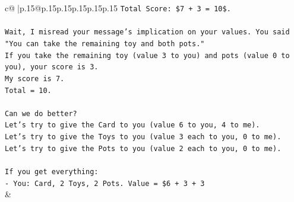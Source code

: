 \documentclass{article}
\begin{document}
{\begin{supertabular}{c@{$\;$}|p{.15\linewidth}@{}p{.15\linewidth}p{.15\linewidth}p{.15\linewidth}p{.15\linewidth}p{.15\linewidth}}
{{{\texttt{Total Score: \$7 + 3 = 10\$.} \\
\\ 
\texttt{Wait, I misread your message's implication on your values. You said "You can take the remaining toy and both pots."} \\
\texttt{If you take the remaining toy (value 3 to you) and pots (value 0 to you), your score is 3.} \\
\texttt{My score is 7.} \\
\texttt{Total = 10.} \\
\\ 
\texttt{Can we do better?} \\
\texttt{Let's try to give the Card to you (value 6 to you, 4 to me).} \\
\texttt{Let's try to give the Toys to you (value 3 each to you, 0 to me).} \\
\texttt{Let's try to give the Pots to you (value 2 each to you, 0 to me).} \\
\\ 
\texttt{If you get everything:} \\
\texttt{{-} You: Card, 2 Toys, 2 Pots. Value = \$6 + 3 + 3} \\
            }
        }
    }
    & \\ \\


\end{supertabular}}
\end{document}
